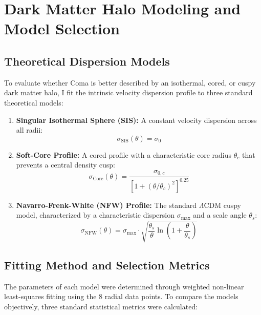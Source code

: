 \documentclass[twocolumn]{aastex631}
\begin{document}
\section{Dark Matter Halo Modeling and Model Selection} \label{sec:models}

\subsection{Theoretical Dispersion Models}
To evaluate whether Coma is better described by an isothermal, cored, or cuspy dark matter halo, I fit the intrinsic velocity dispersion profile to three standard theoretical models:

\begin{enumerate}
	\item \textbf{Singular Isothermal Sphere (SIS):} A constant velocity dispersion across all radii:
	\begin{equation}
		\sigma_{\text{SIS}}(\theta) = \sigma_0
	\end{equation}

	\item \textbf{Soft-Core Profile:} A cored profile with a characteristic core radius $\theta_c$ that prevents a central density cusp:
	\begin{equation}
		\sigma_{\text{Core}}(\theta) = \frac{\sigma_{0,c}}{\left[1 + (\theta/\theta_c)^2\right]^{0.25}}
	\end{equation}

	\item \textbf{Navarro-Frenk-White (NFW) Profile:} The standard $\Lambda\text{CDM}$ cuspy model, characterized by a characteristic dispersion $\sigma_{\text{max}}$ and a scale angle $\theta_s$:
	\begin{equation}
		\sigma_{\text{NFW}}(\theta) = \sigma_{\text{max}} \cdot \sqrt{\frac{\theta_s}{\theta} \ln\left(1 + \frac{\theta}{\theta_s}\right)}
	\end{equation}
\end{enumerate}

\subsection{Fitting Method and Selection Metrics}
The parameters of each model were determined through weighted non-linear least-squares fitting using the 8 radial data points. To compare the models objectively, three standard statistical metrics were calculated:
\end{document}
